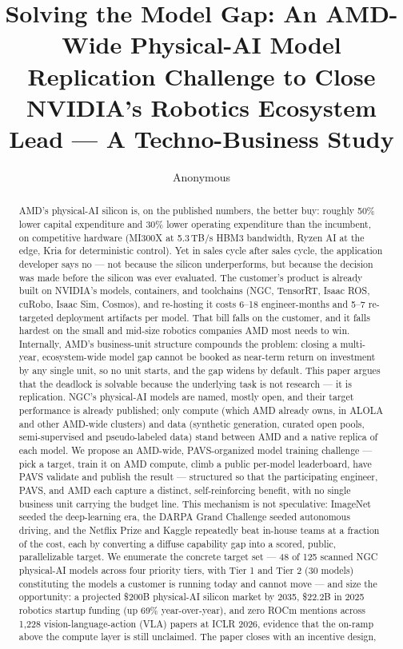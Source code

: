 \documentclass[blind]{gtac}
\title{{Solving the Model Gap: An AMD-Wide Physical-AI Model Replication Challenge to Close NVIDIA's Robotics Ecosystem Lead --- A Techno-Business Study}}
\author{Anonymous}
\begin{document}
\maketitle

\pagestyle{fancy}
\fancyhf{}
\cfoot{\thepage}
\renewcommand{\headrulewidth}{0pt}
\thispagestyle{fancy}

\begin{abstract}
AMD's physical-AI silicon is, on the published numbers, the better buy: roughly 50\% lower capital expenditure and 30\% lower operating expenditure than the incumbent, on competitive hardware (MI300X at 5.3\,TB/s HBM3 bandwidth, Ryzen AI at the edge, Kria for deterministic control). Yet in sales cycle after sales cycle, the application developer says no --- not because the silicon underperforms, but because the decision was made before the silicon was ever evaluated. The customer's product is already built on NVIDIA's models, containers, and toolchains (NGC, TensorRT, Isaac ROS, cuRobo, Isaac Sim, Cosmos), and re-hosting it costs 6--18 engineer-months and 5--7 re-targeted deployment artifacts per model. That bill falls on the customer, and it falls hardest on the small and mid-size robotics companies AMD most needs to win. Internally, AMD's business-unit structure compounds the problem: closing a multi-year, ecosystem-wide model gap cannot be booked as near-term return on investment by any single unit, so no unit starts, and the gap widens by default. This paper argues that the deadlock is solvable because the underlying task is not research --- it is replication. NGC's physical-AI models are named, mostly open, and their target performance is already published; only compute (which AMD already owns, in ALOLA and other AMD-wide clusters) and data (synthetic generation, curated open pools, semi-supervised and pseudo-labeled data) stand between AMD and a native replica of each model. We propose an AMD-wide, PAVS-organized model training challenge --- pick a target, train it on AMD compute, climb a public per-model leaderboard, have PAVS validate and publish the result --- structured so that the participating engineer, PAVS, and AMD each capture a distinct, self-reinforcing benefit, with no single business unit carrying the budget line. This mechanism is not speculative: ImageNet seeded the deep-learning era, the DARPA Grand Challenge seeded autonomous driving, and the Netflix Prize and Kaggle repeatedly beat in-house teams at a fraction of the cost, each by converting a diffuse capability gap into a scored, public, parallelizable target. We enumerate the concrete target set --- 48 of 125 scanned NGC physical-AI models across four priority tiers, with Tier 1 and Tier 2 (30 models) constituting the models a customer is running today and cannot move --- and size the opportunity: a projected \$200B physical-AI silicon market by 2035, \$22.2B in 2025 robotics startup funding (up 69\% year-over-year), and zero ROCm mentions across 1{,}228 vision-language-action (VLA) papers at ICLR 2026, evidence that the on-ramp above the compute layer is still unclaimed. The paper closes with an incentive design, 
\end{abstract}
\end{document}
